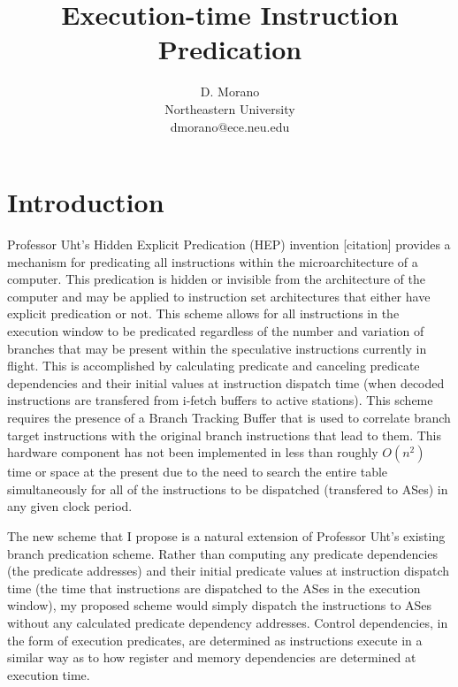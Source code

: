 \documentclass[10pt,dvips]{article}
\begin{document}
\parskip 2mm
%
%
\title{Execution-time Instruction Predication}
%
\author{
D. Morano\\
Northeastern University\\
dmorano@ece.neu.edu\\
}
%
\maketitle
%
%
%
\section{Introduction}
%
Professor Uht's Hidden Explicit Predication (HEP)
invention 
[citation] 
provides a
mechanism for predicating all instructions within
the microarchitecture of a computer.  This predication is hidden
or invisible from the architecture of the computer and may be
applied to instruction set architectures that either have
explicit predication or not.
This scheme allows for all instructions in the execution window to be
predicated regardless of the number and variation of branches that may
be present within the speculative instructions currently in flight.
This is accomplished by calculating predicate and
canceling predicate dependencies and their initial values at
instruction dispatch time (when decoded instructions are transfered
from i-fetch buffers to active stations).
This scheme requires the
presence of a Branch Tracking Buffer that is used to correlate branch
target instructions with the original branch instructions that lead to
them.  This hardware component has not been implemented in less than
roughly $ O(n ^ 2) $ time or space at the present due to the need to
search the entire table simultaneously for all of the instructions to
be dispatched (transfered to ASes) in any given clock period.  

The new scheme that I propose is a natural
extension of Professor Uht's existing branch predication scheme.
Rather than computing any predicate dependencies (the predicate addresses)
and their initial predicate values at instruction dispatch time (the time
that instructions are dispatched to the ASes in the execution window), 
my proposed scheme would
simply dispatch the instructions to ASes without any calculated predicate 
dependency addresses.  Control dependencies, in the form of
execution predicates, are determined as
instructions execute in a similar way as to how register and
memory dependencies are determined at execution time.
%
\end{document}
